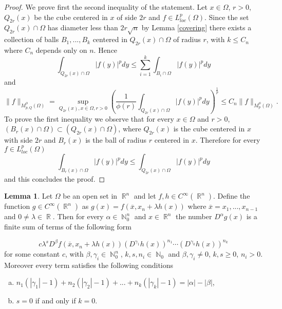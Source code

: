 \documentclass[12pt]{article}
\theoremstyle{definition}
\newtheorem{lemma}{Lemma}
\DeclareMathOperator\rr{\mathbb{R}}
\DeclareMathOperator\nn{\mathbb{N}}
\begin{document}
\begin{proof}
We prove first the second inequality of the statement. Let $x \in \Omega$, $r>0$, $Q_{2r}(x)$ be the cube centered in $x$ of side $2r$ and $f \in L^p_{loc}(\Omega)$. Since the set $Q_{2r}(x) \cap \Omega$ has diameter less than $2r\sqrt n$ by Lemma \ref{covering} there exists a collection of balls $B_1,...,B_k$ centered in $Q_{2r}(x) \cap \Omega$ of radius $r$, with $k\le C_n$ where $C_n$ depends only on $n.$ Hence 
\[ 	\int_{Q_{2r}(x)\cap\Omega} |f(y)|^p dy \le \sum_{i=1}^k \int_{B_i\cap\Omega} |f(y)|^p dy\]
and
\[ \| f\|_{M_{p,Q}^\phi(\Omega)}=\sup_{Q_{2r}(x) ,x \in \Omega,r>0} \left( \frac{1}{\phi(r)}\int_{Q_{2r}(x)\cap\Omega} |f(y)|^p dy \right)^{\frac{1}{p}} \le C_n \| f\|_{M_p^\phi(\Omega)}.\]
To prove the first inequality we observe that for every $x \in \Omega$ and $r>0$, $(B_r(x)\cap\Omega)\subset (Q_{2r}(x)\cap\Omega)$, where $Q_{2r}(x)$ is the cube centered in $x$ with side $2r$ and $B_r(x)$ is the ball of radius $r$ centered in $x$. Therefore for every $f \in L^p_{loc}(\Omega)$
\[ \int_{B_r(x)\cap\Omega} |f(y)|^p dy \le \int_{Q_{2r}(x)\cap\Omega} |f(y)|^p dy\]
and this concludes the proof.

\end{proof}

\begin{lemma}\label{derivatives}
Let $\Omega$ be an open set in $\rr^n$ and let $f,h \in C^\infty(\rr^n)$. Define the function $g\in C^\infty(\rr^n)$ as $g(x)=f(\overline x, x_n+\lambda h(x))$ where $\overline x=x_1,...,x_{n-1}$ and $0\neq\lambda \in \rr.$ Then for every $\alpha \in \nn_0^n$ and $x \in \rr^n$ the number $D^\alpha g(x)$ is a finite sum of terms of the following form

\[
c\lambda^s D^{\beta} f(\overline x, x_n+\lambda h(x))(D^{\gamma_1}h(x))^{n_1}\cdots (D^{\gamma_k}h(x))^{n_k}
\]
for some constant $c$, with $\beta,\gamma_i \in \nn_0^n $, $k,s,n_i \in \nn_0$ and $\beta,\gamma_i\neq0$, $k,s\ge 0$, $n_i>0$. Moreover every term satisfies the following conditions
\begin{enumerate}[a)]
\item $n_1(|\gamma_1|-1)+n_2(|\gamma_2|-1)+...+n_k(|\gamma_k|-1)=|\alpha|-|\beta|$,
\item  $s=0$ if and only if $k=0$.
\end{enumerate}
\end{lemma}
\end{document}

